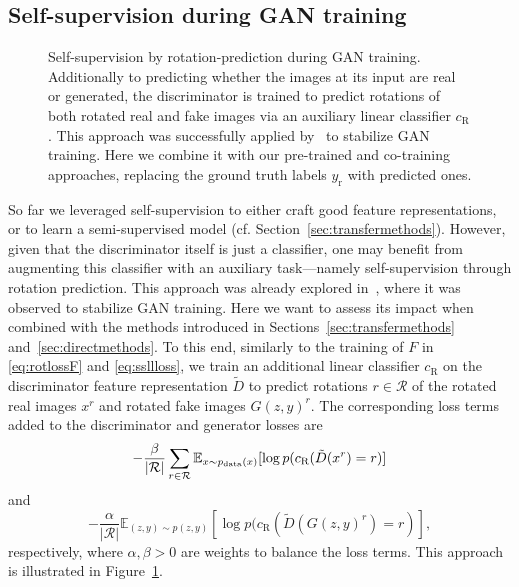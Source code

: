 \documentclass{article}
\newcommand{\pdata}{p_{\rm{data}}}
\newcommand{\E}{\mathbb{E}}
\newcommand{\cRot}{c_\text{R}}
\newcommand{\Dt}{\tilde D}
\newcommand{\xR}{x^r}
\begin{document}
\subsection{Self-supervision during GAN training}\label{sec:selfsup}
\begin{figure}[t!]
\centering
{}
\caption{Self-supervision by rotation-prediction during GAN training. Additionally to predicting whether the images at its input are real or generated, the discriminator is trained to predict rotations of both rotated real and fake images via an auxiliary linear classifier $\cRot$. This approach was successfully applied by~\citet{chen2019self} to stabilize GAN training. Here we combine it with our pre-trained and co-training approaches, replacing the ground truth labels $y_\text{r}$ with predicted ones.\label{fig:ssgan}}
\vspace{-0.2cm}
\end{figure}
So far we leveraged self-supervision to either craft good feature representations, or to learn a semi-supervised model (cf. Section~\ref{sec:transfermethods}). However, given that the discriminator itself is just a classifier, one may benefit from augmenting this classifier with an auxiliary task---namely self-supervision through rotation prediction. This approach was already explored in~\citet{chen2019self}, where it was observed to stabilize GAN training. Here we want to assess its impact when combined with the methods introduced in Sections~\ref{sec:transfermethods} and~\ref{sec:directmethods}. To this end, similarly to the training of $F$ in \eqref{eq:rotlossF} and \eqref{eq:ssllloss}, we train an additional linear classifier $\cRot$ on the discriminator feature representation $\Dt$ to predict rotations $r \in \mathcal R$ of the rotated real images $\xR$ and rotated fake images $G(z,y)^r$. The corresponding loss terms added to the discriminator and generator losses are
\begin{equation}\label{eq:ssganD}
-\frac{\beta}{|\mathcal{R}|} \sum_{r \in \mathcal{R}} \E_{x \sim \pdata(x)}[\log p(\cRot(\Dt(\xR)=r)]
\end{equation}
and
\begin{equation}\label{eq:ssganG}
-\frac{\alpha}{|\mathcal{R}|} \E_{(z,y) \sim p(z,y)}[\log p(\cRot(\Dt(G(z,y)^r)=r)],
\end{equation}
respectively, where $\alpha, \beta>0$ are weights to balance the loss terms. This approach is illustrated in Figure~\ref{fig:ssgan}.
\end{document}
